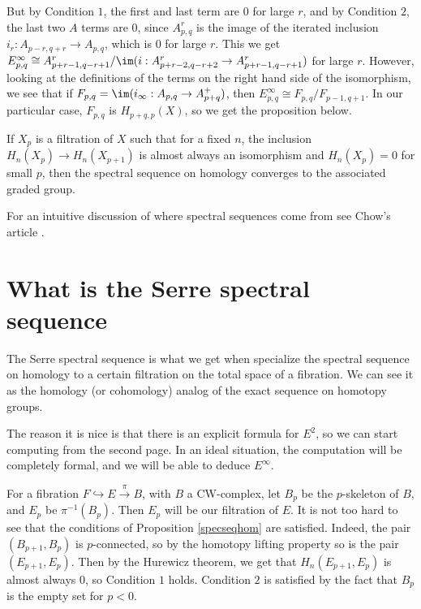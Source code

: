 \documentclass[12pt,oneside]{amsart}
\begin{document}
\begin{center}
\end{center}

But by Condition $1$, the first and last term are $0$ for large $r$, and by Condition $2$, the last two $A$ terms are $0$, since $A^r_{p,q}$ is the image of the iterated inclusion $i_r:A_{p-r,q+r}\to A_{p,q}$, which is $0$ for large $r$. This we get $E^\infty_{p,q} \cong A^r_{p+r-1,q-r+1}/\im(i:A^r_{p+r-2,q-r+2} \to A^r_{p+r-1,q-r+1})$ for large $r$. However, looking at the definitions of the terms on the right hand side of the isomorphism, we see that if $F_{p,q} = \im(i_\infty: A_{p,q} \to A^+_{p+q})$, then $E^\infty_{p,q} \cong F_{p,q}/F_{p-1,q+1}$. In our particular case, $F_{p,q}$ is $H_{p+q,p}(X)$, so we get the proposition below.

\begin{proposition}\label{specseqhom}
If $X_p$ is a filtration of $X$ such that for a fixed $n$, the inclusion $H_n(X_p) \to H_n(X_{p+1})$ is almost always an isomorphism and $H_n(X_p) = 0$ for small $p$, then the spectral sequence on homology converges to the associated graded group.  
\end{proposition}

For an intuitive discussion of where spectral sequences come from see Chow's article \cite{chowss}.

\section{What is the Serre spectral sequence}
The Serre spectral sequence is what we get when specialize the spectral sequence on homology to a certain filtration on the total space of a fibration. We can see it as the homology (or cohomology) analog of the exact sequence on homotopy groups.

The reason it is nice is that there is an explicit formula for $E^2$, so we can start computing from the second page. In an ideal situation, the computation will be completely formal, and we will be able to deduce $E^\infty$.

For a fibration $F \hookrightarrow E \xrightarrow{\pi} B$, with $B$ a CW-complex, let $B_p$ be the $p$-skeleton of $B$, and $E_p$ be $\pi^{-1}(B_p)$. Then $E_p$ will be our filtration of $E$. It is not too hard to see that the conditions of Proposition \ref{specseqhom} are satisfied. Indeed, the pair $(B_{p+1},B_p)$ is $p$-connected, so by the homotopy lifting property so is the pair $(E_{p+1},E_p)$. Then by the Hurewicz theorem, we get that $H_n(E_{p+1},E_p)$ is almost always $0$, so Condition $1$ holds.
Condition $2$ is satisfied by the fact that $B_p$ is the empty set for $p<0$.
\end{document}
